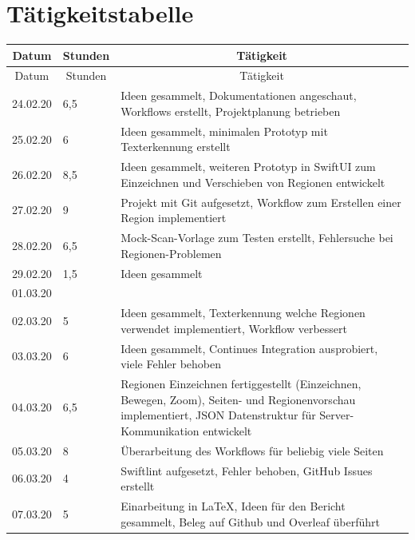 \documentclass[notables, nomenclature, oneside, 150]{HSMW-Thesis}
\begin{document}
\chapter{Tätigkeitstabelle}
    \setlength\LTleft{0pt}
	\setlength\LTright{0pt}
	\begin{longtable}{
		|p{}
		|p{}
		|p{}|
	}

	\multicolumn{1}{c}{Datum}&
	\multicolumn{1}{c}{Stunden}&
	\multicolumn{1}{c}{Tätigkeit}\\
	\endfirsthead
	\multicolumn{1}{c}{Datum}&
	\multicolumn{1}{c}{Stunden}&
	\multicolumn{1}{c}{Tätigkeit}\\
	\endhead
	
    \hline
        24.02.20 & 6,5 & Ideen gesammelt, Dokumentationen angeschaut, Workflows erstellt, Projektplanung betrieben \\ \hline
        25.02.20 & 6 & Ideen gesammelt,  minimalen  Prototyp mit Texterkennung erstellt \\ \hline
        26.02.20 & 8,5 & Ideen gesammelt,  weiteren Prototyp in SwiftUI  zum Einzeichnen und Verschieben von Regionen entwickelt \\ \hline
        27.02.20 & 9 & Projekt mit Git aufgesetzt,  Workflow zum Erstellen einer Region implementiert \\ \hline
        28.02.20 & 6,5 & Mock-Scan-Vorlage zum Testen erstellt, Fehlersuche bei Regionen-Problemen \\ \hline
        29.02.20 & 1,5 & Ideen gesammelt \\ \hline
        01.03.20 &  &  \\ \hline
		\hline        
        02.03.20 & 5 & Ideen gesammelt, Texterkennung welche Regionen verwendet implementiert, Workflow verbessert \\ \hline
        03.03.20 & 6 & Ideen gesammelt, Continues Integration ausprobiert, viele Fehler behoben \\ \hline
        04.03.20 & 6,5 & Regionen Einzeichnen fertiggestellt (Einzeichnen, Bewegen, Zoom), Seiten- und Regionenvorschau implementiert, JSON Datenstruktur für Server-Kommunikation entwickelt \\ \hline
        05.03.20 & 8 & Überarbeitung des Workflows für beliebig viele Seiten \\ \hline
        06.03.20 & 4 & Swiftlint aufgesetzt, Fehler behoben, GitHub Issues erstellt \\ \hline
        07.03.20 & 5 & Einarbeitung in LaTeX, Ideen für den Bericht gesammelt, Beleg auf Github und Overleaf überführt  \\ \hline

\end{longtable}
\end{document}
